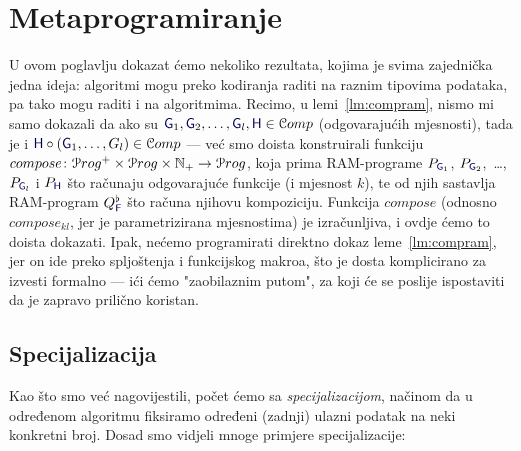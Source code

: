 \chapter{Metaprogramiranje}

U ovom poglavlju dokazat ćemo nekoliko rezultata, kojima je svima zajednička jedna ideja: algoritmi mogu preko kodiranja raditi na raznim tipovima podataka, pa tako mogu raditi i na algoritmima. Recimo, u lemi~\ref{lm:compram}, nismo mi samo dokazali da ako su $\f G_1,\f G_2,\dotsc,\f G_l,\f H\in\mathcal Comp$ (odgovarajućih mjesnosti), tada je i $\f H\circ(\f G_1,\dotsc,G_l)\in\mathcal Comp$ --- već smo doista konstruirali funkciju $compose\colon\mathcal Prog^+\times\mathcal Prog\times{\mathbb N}_+\to\mathcal Prog$, koja prima RAM-programe $P_{\f G_1}$, $P_{\f G_2}$,~\ldots, $P_{\f G_l}$ i $P_{\f H}$ što računaju odgovarajuće funkcije (i mjesnost $k$), te od njih sastavlja RAM-program $Q_{\f F}^\flat$ što računa njihovu kompoziciju. Funkcija $compose$ (odnosno $compose_{kl}$, jer je parametrizirana mjesnostima) je izračunljiva, i ovdje ćemo to doista dokazati. Ipak, nećemo programirati direktno dokaz leme~\ref{lm:compram}, jer on ide preko spljoštenja i funkcijskog makroa, što je dosta komplicirano za izvesti formalno --- ići ćemo "zaobilaznim putom", za koji će se poslije ispostaviti da je zapravo prilično koristan.

\section{Specijalizacija}

Kao što smo već nagovijestili, počet ćemo sa \emph{specijalizacijom}, načinom da u od\-re\-đe\-nom algoritmu fiksiramo određeni (zadnji) ulazni podatak na neki konkretni broj. Dosad smo vidjeli mnoge primjere specijalizacije:

